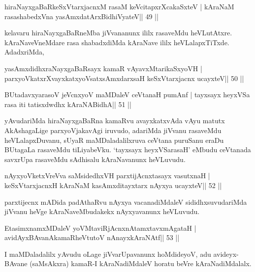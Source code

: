 

\begin{shl}
hiraNayxgaBaRkeSxVtarxjacnxM rasaM keVcitapxrXcakaSxteV |
kAraNaM rasashabedxVna yasAmxdatArxBidhiVyateV\hfill || 49 ||
\end{shl}

\begin{artha}
kelavaru hiraNayxgaBaRneMba jiVvananunx ililx rasaveMdu
heVLutAtxre. kAraNaveVneMdare rasa shabadxdiMda kAraNave ililx
heVLalapxTiTxde. AdadxriMda, 
\end{artha}


\begin{shl}
yasAmxdidhxraNayxgaBaRsayx kamaR vAyavxMtarikaSxyoVH |
parxyoVkatxrXvayxkatxyoVsatxsAmxdarxsaH keSxVtarxjacnx ucayxteV\hfill || 50 ||
\end{shl}

\begin{shl}
BUtadavxyarasoV jeVcnxyoV maMDaleV ceVtanaH pumAnf |
tayxsayx heyxVSa rasa iti tatisxdwdhx kAraNABidhA\hfill || 51 ||
\end{shl}

\begin{artha}
yAvudariMda hiraNayxgaBaRna kamaRvu avayxkatxvAda vAyu matutx AkAshagaLige parxyoVjakavAgi iruvudo, adariMda jiVvanu rasaveMdu heVLalapxDuvanu, sUyaR maMDaladalilxruva ceVtana puruSanu eraDu BUtagaLa rasaveMdu tiLiyabeVku. `tayxsayx heyxVSarasaH' eMbudu ceVtanada savxrUpa rasaveMdu sAdhisalu kAraNavanunx heVLuvudu.
\end{artha}

\begin{shl}
nAyxyoVketxVreVva saMsidedhxVH parxtijAcnxtasayx vasutxnaH |
keSxVtarxjacnxH kAraNaM kasAmxditayxtarx nAyxya ucayxteV\hfill || 52 ||
\end{shl}

\begin{artha}
parxtijecnx mADida padAthaRvu nAyxya vacanadiMdaleV sididhxsuvudariMda jiVvanu heVge kAraNaveMbudakekx nAyxyavanunx heVLuvudu.
\end{artha}

\begin{shl}
EtasimxnamxMDaleV yoV\s MtaviRjAcnxnAtamxtavxmAgataH |
avidAyxBAvanAkamaRheVtutoV nAnayxkAraNAtf\hfill || 53 ||
\end{shl}

\begin{artha}
I maMDaladalilx yAvudu oLage jiVvarUpavanunx hoMdideyoV, adu
avideyx-BAvane (saMsAkxra) kamaR-I kAraNadiMdaleV horatu beVre kAraNadiMdalalx.
\end{artha}

